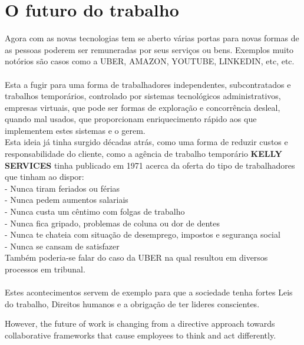\section{O futuro do trabalho}
\qquad Agora com as novas tecnologias tem se aberto várias portas para novas formas de as pessoas poderem ser remuneradas por seus serviços ou bens. Exemplos muito notórios são casos como a UBER, AMAZON, YOUTUBE, LINKEDIN, etc, etc.\\
\\
Esta a fugir para uma forma de trabalhadores independentes, subcontratados e trabalhos temporários, controlado por sistemas tecnológicos administrativos, empresas virtuais, que pode ser formas de exploração e concorrência desleal, quando mal usados, que proporcionam enriquecimento rápido aos que implementem estes sistemas e o gerem.\\
Esta ideia já tinha surgido décadas atrás, como uma forma de reduzir custos e responsabilidade do cliente, como a agência de trabalho temporário \textbf{KELLY SERVICES} tinha publicado em 1971 acerca da oferta do tipo de trabalhadores que tinham ao dispor:\cite{book_11}\\
\hspace*{.5cm} - Nunca tiram feriados ou férias\\
\hspace*{.5cm} - Nunca pedem aumentos salariais\\
\hspace*{.5cm} - Nunca custa um cêntimo com folgas de trabalho\\
\hspace*{.5cm} - Nunca fica gripado, problemas de coluna ou dor de dentes\\
\hspace*{.5cm} - Nunca te chateia com situação de desemprego, impostos e segurança social\\
\hspace*{.5cm} - Nunca se cansam de satisfazer\\
Também poderia-se falar do caso da UBER na qual resultou em diversos processos em tribunal.\\
\\ 
Estes acontecimentos servem de exemplo para que a sociedade tenha fortes Leis do trabalho, Direitos humanos e a obrigação de ter lideres conscientes.


However, the future of work is changing from a directive approach towards collaborative frameworks that cause employees to think and act differently.


